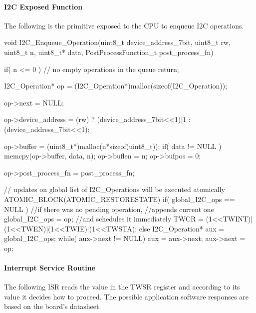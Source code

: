\paragraph{I2C Exposed Function}
The following is the primitive exposed to the CPU to enqueue I2C operations.
\begin{ccode}
	void I2C_Enqueue_Operation(uint8_t device_address_7bit, uint8_t rw, uint8_t n, uint8_t* data, PostProcessFunction_t post_process_fn) {
		if( n <= 0 )	// no empty operations in the queue
			return;
	
		I2C_Operation* op = (I2C_Operation*)malloc(sizeof(I2C_Operation));
	
		op->next = NULL;
	
		op->device_address = (rw) ? (device_address_7bit<<1)|1 : (device_address_7bit<<1);
	
		op->buffer = (uint8_t*)malloc(n*sizeof(uint8_t));
		if( data != NULL )
			memcpy(op->buffer, data, n);
		op->buflen = n;
		op->bufpos = 0;
	
		op->post_process_fn = post_process_fn;
	
		// updates on global list of I2C_Operations will be executed atomically
		ATOMIC_BLOCK(ATOMIC_RESTORESTATE){
			if( global_I2C_ops == NULL ) {
				//if there was no pending operation,
					//appends current one
				global_I2C_ops = op;
					//and schedules it immediately
				TWCR = (1<<TWINT)|(1<<TWEN)|(1<<TWIE)|(1<<TWSTA);
			} else {
				I2C_Operation* aux = global_I2C_ops;
				while( aux->next != NULL)
					aux = aux->next;
				aux->next = op;
			}
		}
	}
\end{ccode}

\paragraph{Interrupt Service Routine}
The following ISR reads the value in the TWSR register and according to its value it decides how to proceed. The possible application software responses are based on the board's datasheet\supercite{mega2560_datasheet}.

